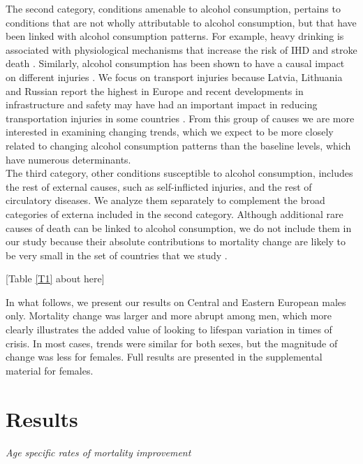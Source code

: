 \documentclass{article}
\begin{document}
\begin{spacing}{1.5}
The second category, conditions amenable to alcohol consumption, pertains to conditions that are not wholly attributable to alcohol consumption, but that have been linked with alcohol consumption patterns. For example, heavy drinking is associated with physiological mechanisms that increase the risk of IHD and stroke death \citep{rehm2010relation}.  Similarly, alcohol consumption has been shown to have a causal impact on different injuries \citep{rehm2003relationship}. We focus on transport injuries because Latvia,
Lithuania and Russian report the highest in Europe \citep{avenoso2005safety} and recent developments in infrastructure and safety may have had an important impact in reducing transportation injuries in some countries \citep{world2009european,world2013global}. From this group of causes we are more interested in examining changing trends, which we expect to be more closely related to changing alcohol consumption patterns than the baseline levels, which have numerous determinants. \\

The third category, other conditions susceptible to alcohol consumption, includes the rest of external causes, such as self-inflicted injuries, and the rest of circulatory diseases. We analyze them separately to complement the broad categories of externa included in the second category. Although additional rare causes of death can be linked to alcohol consumption, we do not include them in our study because their absolute contributions to mortality change are likely to be very small in the set of countries that we study \citep{grigoriev2015}.\\


\begin{center}
[Table \ref{T1} about here]
\end{center}



In what follows, we present our results on \textcolor[rgb]{1,0,0}{Central and }Eastern European males only. \textcolor[rgb]{1,0,0}{Mortality change was larger and more abrupt among men}, which more clearly illustrates the added value of looking to lifespan variation in times of crisis. In most cases, trends were similar for both sexes, but the magnitude of change was less for females. Full results are presented in the supplemental material for females.



\section*{Results}
\emph{Age specific rates of mortality improvement}\\


\end{spacing}
\end{document}
